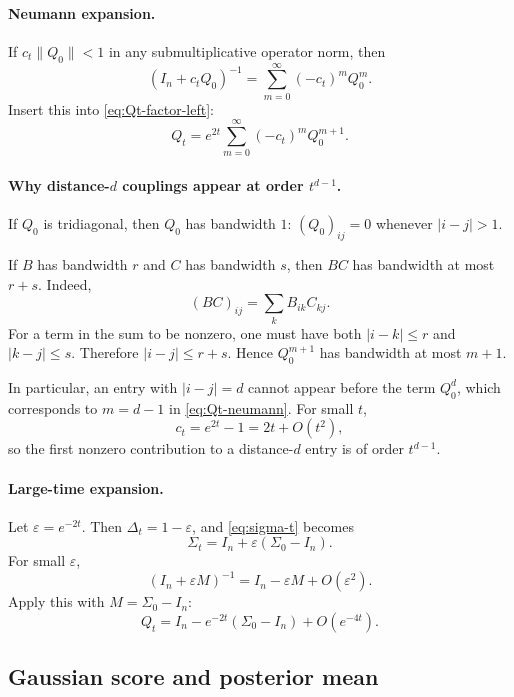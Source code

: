 \documentclass[11pt,a4paper]{article}
\newcommand{\Dt}{\Delta_t}
\begin{document}
\paragraph{Neumann expansion.}
If $c_t \|Q_0\|<1$ in any submultiplicative operator norm, then
\begin{equation}
(I_n + c_t Q_0)^{-1}
=
\sum_{m=0}^{\infty} (-c_t)^m Q_0^m.
\label{eq:neumann}
\end{equation}
Insert this into \eqref{eq:Qt-factor-left}:
\begin{equation}
Q_t = e^{2t} \sum_{m=0}^{\infty} (-c_t)^m Q_0^{m+1}.
\label{eq:Qt-neumann}
\end{equation}

\paragraph{Why distance-$d$ couplings appear at order $t^{d-1}$.}
If $Q_0$ is tridiagonal, then $Q_0$ has bandwidth $1$: $(Q_0)_{ij}=0$ whenever $|i-j|>1$.

If $B$ has bandwidth $r$ and $C$ has bandwidth $s$, then $BC$ has bandwidth at most $r+s$. Indeed,
\[
(BC)_{ij} = \sum_k B_{ik} C_{kj}.
\]
For a term in the sum to be nonzero, one must have both $|i-k|\le r$ and $|k-j|\le s$. Therefore $|i-j|\le r+s$. Hence $Q_0^{m+1}$ has bandwidth at most $m+1$.

In particular, an entry with $|i-j|=d$ cannot appear before the term $Q_0^d$, which corresponds to $m=d-1$ in \eqref{eq:Qt-neumann}. For small $t$,
\[
c_t = e^{2t}-1 = 2t + O(t^2),
\]
so the first nonzero contribution to a distance-$d$ entry is of order $t^{d-1}$.

\paragraph{Large-time expansion.}
Let $\varepsilon = e^{-2t}$. Then $\Dt = 1-\varepsilon$, and \eqref{eq:sigma-t} becomes
\[
\Sigma_t = I_n + \varepsilon (\Sigma_0-I_n).
\]
For small $\varepsilon$,
\[
(I_n + \varepsilon M)^{-1} = I_n - \varepsilon M + O(\varepsilon^2).
\]
Apply this with $M=\Sigma_0-I_n$:
\begin{equation}
Q_t = I_n - e^{-2t}(\Sigma_0-I_n) + O(e^{-4t}).
\label{eq:Qt-large-time}
\end{equation}

\subsection{Gaussian score and posterior mean}
\end{document}
